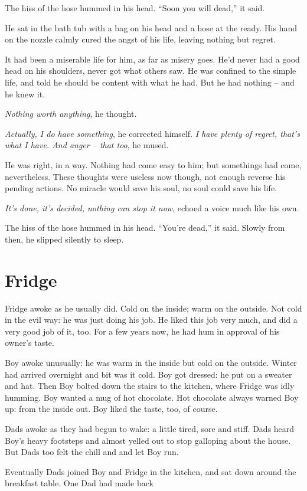 \documentclass[fontsize=12pt,english]{scrreprt}
\begin{document}
The hiss of the hose hummed in his head. ``Soon you will dead,'' it
said.

He sat in the bath tub with a bag on his head and a hose at the
ready. His hand on the nozzle calmly cured the angst of his life,
leaving nothing but regret.

It had been a miserable life for him, as far as misery goes. He'd
never had a good head on his shoulders, never got what others saw. He
was confined to the simple life, and told he should be content with
what he had. But he had nothing -- and he knew it.

\textit{Nothing worth anything}, he thought.

\textit{Actually, I do have something}, he corrected
himself. \textit{I have plenty of regret, that's what I have. And
  anger -- that too}, he mused.

He was right, in a way. Nothing had come easy to him; but somethings
had come, nevertheless. These thoughts were useless now though, not
enough reverse his pending actions. No miracle would save his soul, no
soul could save his life.

\textit{It's done, it's decided, nothing can stop it now}, echoed a
voice much like his own.

The hiss of the hose hummed in his head. ``You're dead,'' it
said. Slowly from then, he slipped silently to sleep.

\newpage

\section{Fridge}

Fridge awoke as he usually did. Cold on the inside; warm on the
outside. Not cold in the evil way: he was just doing his job. He liked
this job very much, and did a very good job of it, too. For a few
years now, he had hum in approval of his owner's taste.

Boy awoke unusually: he was warm in the inside but cold on the
outside. Winter had arrived overnight and bit was it cold. Boy got
dressed: he put on a sweater and hat. Then Boy bolted down the stairs
to the kitchen, where Fridge was idly humming. Boy wanted a mug of hot
chocolate. Hot chocolate always warned Boy up: from the inside
out. Boy liked the taste, too, of course.

Dads awoke as they had begun to wake: a little tired, sore and
stiff. Dads heard Boy's heavy footsteps and almost yelled out to stop
galloping about the house. But Dads too felt the chill and and let Boy
run.

Eventually Dads joined Boy and Fridge in the kitchen, and sat down
around the breakfast table. One Dad had made back
\end{document}
